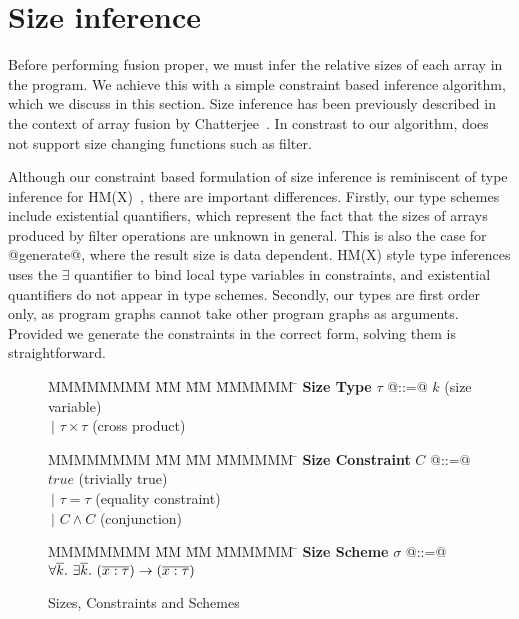 \section{Size inference}
Before performing fusion proper, we must infer the relative sizes of each array in the program. We achieve this with a simple constraint based inference algorithm, which we discuss in this section. Size inference has been previously described in the context of array fusion by Chatterjee~\cite{chatterjee1991size}. In constrast to our algorithm, \cite{chatterjee1991size} does not support size changing functions such as filter.

Although our constraint based formulation of size inference is reminiscent of type inference for HM(X)~\cite{odersky1999type}, there are important differences. Firstly, our type schemes include existential quantifiers, which represent the fact that the sizes of arrays produced by filter operations are unknown in general. This is also the case for @generate@, where the result size is data dependent. HM(X) style type inferences uses the $\exists$ quantifier to bind local type variables in constraints, and existential quantifiers do not appear in type schemes. Secondly, our types are first order only, as program graphs cannot take other program graphs as arguments. Provided we generate the constraints in the correct form, solving them is straightforward.


\begin{figure}
\begin{tabbing}
MMMMMMMM \= MM  \= MM \= MMMMMM \= \kill
\textbf{Size Type}
\> $\tau$   \> @::=@  \> $k$                  \> (size variable)       \\
\>          \> $~|$   \> $\tau \times \tau$   \> (cross product)
\end{tabbing}

\begin{tabbing}
MMMMMMMM \= MM  \= MM \= MMMMMM \= \kill
\textbf{Size Constraint}
\> $C$      \> @::=@  \> $true$               \> (trivially true)      \\
\>          \> $~|$   \> $\tau = \tau$        \> (equality constraint) \\
\>          \> $~|$   \> $C \wedge C$         \> (conjunction)
\end{tabbing}

\begin{tabbing}
MMMMMMMM \= MM  \= MM \= MMMMMM \= \kill
\textbf{Size Scheme}
\> $\sigma$ \> @::=@  
        \> $\forall \overline{k}.~ \exists \overline{k}.~ (\overline{ x : \tau }) \to (\overline{x : \tau})$
\end{tabbing}

\caption{Sizes, Constraints and Schemes}
\label{f:constraints}
\end{figure}


